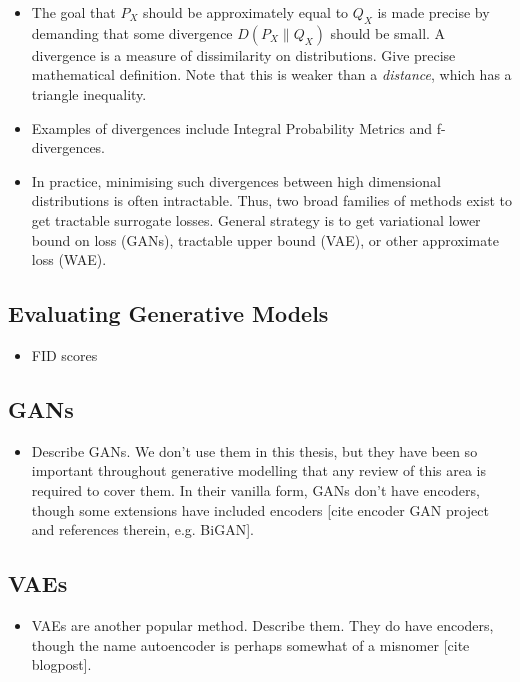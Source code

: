 \begin{itemize}
\item The goal that $P_X$ should be approximately equal to $Q_X$ is made precise by demanding that some divergence $D(P_X \| Q_X)$ should be small. A divergence is a measure of dissimilarity on distributions. Give precise mathematical definition. Note that this is weaker than a \emph{distance}, which has a triangle inequality.
\item Examples of divergences include Integral Probability Metrics and f-divergences. 
\item In practice, minimising such divergences between high dimensional distributions is often intractable. Thus, two broad families of methods exist to get tractable surrogate losses. General strategy is to get variational lower bound on loss (GANs), tractable upper bound (VAE), or other approximate loss (WAE).
\end{itemize}

\subsection{Evaluating Generative Models}

\begin{itemize}
\item FID scores
\end{itemize}

\subsection{GANs}

\begin{itemize}
\item Describe GANs. We don't use them in this thesis, but they have been so important throughout generative modelling that any review of this area is required to cover them. In their vanilla form, GANs don't have encoders, though some extensions have included encoders [cite encoder GAN project and references therein, e.g. BiGAN].
\end{itemize}

\subsection{VAEs}

\begin{itemize}
\item VAEs are another popular method. Describe them. They do have encoders, though the name autoencoder is perhaps somewhat of a misnomer [cite blogpost].
\end{itemize}

